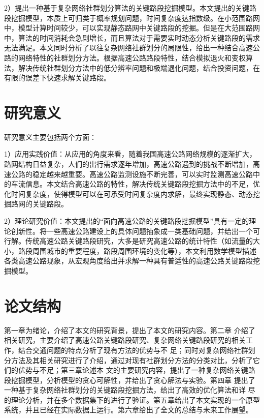 		2）提出一种基于复杂网络社群划分算法的关键路段挖掘模型。本文提出的关键路段挖掘模型，本质上可归类于概率规划问题，时间复杂度达指数级。在小范围路网中，模型计算时间较少，可以实现静态路网中关键路段的挖掘。但是在大范围路网中，算法的时间消耗会急剧增长，而且算法对于需要实时动态分析关键路段的需求无法满足。本文同时分析了以往复杂网络社群划分的局限性，给出一种结合高速公路的网络特性的社群划分方法。根据高速公路路段特性，结合模拟退火和变权算法，解决传统社群划分方法中的低分辨率问题\parencite{WeightPretreatment}和极端退化问题\parencite{WeightPretreatment}，结合投资问题，在有限的误差下快速求解关键路段。

\section{研究意义}
		研究意义主要包括两个方面：

		1）应用实践价值：从应用的角度来看，随着我国高速公路网络规模的逐渐扩大，路网结构日益复杂，人们的出行需求逐年增加，高速公路遇到的挑战不断增加，高速公路的稳定越来越重要。高速公路监测设施不断完善，可以实时监测高速公路中的车流信息。本文结合高速公路的特性，解决传统关键路段挖掘方法中的不足，优化时间复杂度，使得模型可以在可承受时间复杂度内求解，最终实现静态、动态挖掘路网的关键路段。

		2）理论研究价值：本文提出的“面向高速公路的关键路段挖掘模型”具有一定的理论创新性。将一些高速公路建设上的具体问题抽象成一类基础问题，并给出一个可行解。传统高速公路关键路段研究，大多是研究高速公路的统计特性（如流量的大小，路段周围城市的重要程度，路段周围环境的变化等），本文利用数学模型描述各类高速公路现象，从宏观角度给出并求解一种具有普适性的高速公路关键路段挖掘模型。
		
\section{论文结构}
    第一章为绪论，介绍了本文的研究背景，提出了本文的研究内容。第二章
介绍了相关研究，主要介绍了高速公路关键路段研究、复杂网络关键路段研究的相关工作，结合交通问题的特点分析了现有方法的优势与不
足；同时对复杂网络社群划分方法及其相关研究进行了介绍，通过对现有社群划分方法的分类对比，分析了它们的优势与不足；第三章论述本
文的主要研究内容，提出了一种复杂网络关键路段挖掘模型，分析模型的贪心可解性，并给出了贪心解法与实验。第四章
提出了一种基于复杂网络社群划分的关键路段挖掘方法，给出了高效的优化算法和详
尽的理论分析，并在多个数据集下的进行了验证。第五章给出了本文实现的一个原型系统，并且已经在实际数据上运行。第六章给出了全文的总结与未来工作展望。


